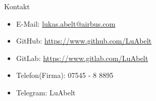 \begin{frame}{Kontakt}{}
	\vfill
	\begin{itemize}
		\item E-Mail: \href{mailto:lukas.abelt@airbus.com}{lukas.abelt@airbus.com}
		\item GitHub: \url{https://www.github.com/LuAbelt}
		\item GitLab: \url{https://www.gitlab.com/LuAbelt}
		\item Telefon(Firma): 07545 - 8 8895
		\item Telegram: LuAbelt
	\end{itemize}
	\vfill
\end{frame}